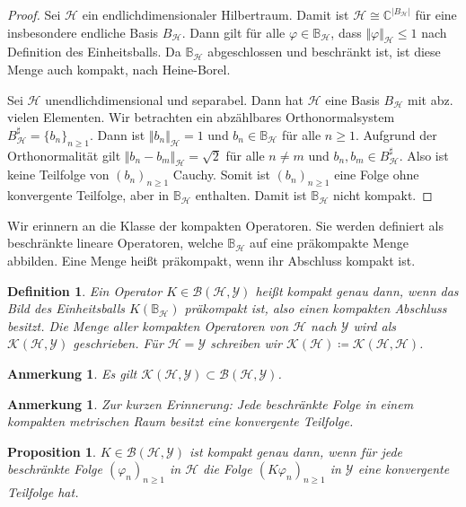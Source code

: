 \documentclass[11pt, hidelinks]{article}
\newcommand{\h}{\mathcal{H}}
\newcommand{\on}{{n \geq 1}}
\numberwithin{conj}{section}
\newtheorem{definition}[conj]{Definition}
\newtheorem{remark}[conj]{Anmerkung}
\newtheorem{proposition}[conj]{Proposition}
\begin{document}
\begin{proof}
    Sei $\h$ ein endlichdimensionaler Hilbertraum. Damit ist $\h \cong \mathbb{C}^{\vert B_\h \vert}$ für eine insbesondere endliche Basis $B_\h$. Dann gilt für alle $\varphi \in \mathbb{B}_\h$, dass $\Vert \varphi \Vert_\h \leq 1$ nach Definition des Einheitsballs. Da $\mathbb{B}_\h$ abgeschlossen und beschränkt ist, ist diese Menge auch kompakt, nach Heine-Borel.

    Sei $\h$ unendlichdimensional und separabel. Dann hat $\h$ eine Basis $B_\h$ mit abz. vielen Elementen. Wir betrachten ein abzählbares Orthonormalsystem $B^\sharp_\h = \{b_n\}_\on$. Dann ist $\Vert b_n \Vert_\h = 1$ und $b_n \in \mathbb{B}_\h$ für alle $n \geq 1$. Aufgrund der Orthonormalität gilt $\Vert b_n - b_m \Vert_\h = \sqrt{2}$ für alle $n \neq m$ und $b_n,b_m \in B^\sharp_\h$. Also ist keine Teilfolge von $(b_n)_\on$ Cauchy. Somit ist $(b_n)_\on$ eine Folge ohne konvergente Teilfolge, aber in $\mathbb{B}_\h$ enthalten. Damit ist $\mathbb{B}_\h$ nicht kompakt.
\end{proof}

Wir erinnern an die Klasse der kompakten Operatoren. Sie werden definiert als beschränkte lineare Operatoren, welche $\mathbb{B}_\h$ auf eine präkompakte Menge abbilden. Eine Menge heißt präkompakt, wenn ihr Abschluss kompakt ist.

\begin{definition}
    Ein Operator $K \in \mathcal{B}(\h,\mathcal{Y})$ heißt kompakt genau dann, wenn das Bild des Einheitsballs $K(\mathbb{B}_\h)$ präkompakt ist, also einen kompakten Abschluss besitzt. Die Menge aller kompakten Operatoren von $\h$ nach $\mathcal{Y}$ wird als $\mathcal{K}(\h,\mathcal{Y})$ geschrieben. Für $\h=\mathcal{Y}$ schreiben wir $\mathcal{K}(\h) \coloneq \mathcal{K}(\h,\h)$.
\end{definition}

\begin{remark}
    Es gilt $\mathcal{K}(\h,\mathcal{Y}) \subset \mathcal{B}(\h,\mathcal{Y})$.
\end{remark}

\begin{remark}
Zur kurzen Erinnerung: Jede beschränkte Folge in einem kompakten metrischen Raum besitzt eine konvergente Teilfolge.
\end{remark}

\begin{proposition}
    $K \in \mathcal{B}(\h,\mathcal{Y})$ ist kompakt genau dann, wenn für jede beschränkte Folge $(\varphi_n)_{n \geq 1}$ in $\h$ die Folge $(K\varphi_n)_{n \geq 1}$ in $\mathcal{Y}$ eine konvergente Teilfolge hat.
\end{proposition}
\end{document}
